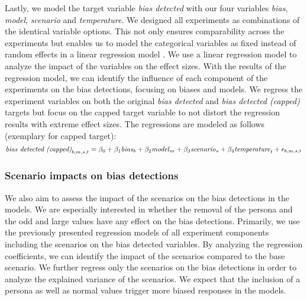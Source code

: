 \par Lastly, we model the target variable \textit{bias detected} with our four variables \textit{bias}, \textit{model}, \textit{scenario} and \textit{temperature}. We designed all experiments as combinations of the identical variable options. This not only ensures comparability across the experiments but enables us to model the categorical variables as fixed instead of random effects in a linear regression model \parencite{borenstein2021introduction, cooper2019handbook, nakagawa2023quantitative}. We use a linear regression model to analyze the impact of the variables on the effect sizes. With the results of the regression model, we can identify the influence of each component of the experiments on the bias detections, focusing on biases and models. We regress the experiment variables on both the original \textit{bias detected} and \textit{bias detected (capped)} targets but focus on the capped target variable to not distort the regression results with extreme effect sizes. The regressions are modeled as follows (exemplary for capped target):
\begin{equation} \label{eq:general_regression_capped}
    \text{\textit{bias detected (capped)}}_{b,m,s,t} = \beta_0 + \beta_1 \text{\textit{bias}}_b + \beta_2 \text{\textit{model}}_m + \beta_3 \text{\textit{scenario}}_s + \beta_4 \text{\textit{temperature}}_t + \epsilon_{b,m,s,t}
\end{equation}


\subsubsection{Scenario impacts on bias detections}
\par We also aim to assess the impact of the scenarios on the bias detections in the models. We are especially interested in whether the removal of the persona and the odd and large values have any effect on the bias detections. Primarily, we use the previously presented regression models of all experiment components including the scenarios on the bias detected variables. By analyzing the regression coefficients, we can identify the impact of the scenarios compared to the base scenario. We further regress only the scenarios on the bias detections in order to analyze the explained variance of the scenarios. We expect that the inclusion of a persona as well as normal values trigger more biased responses in the models.

